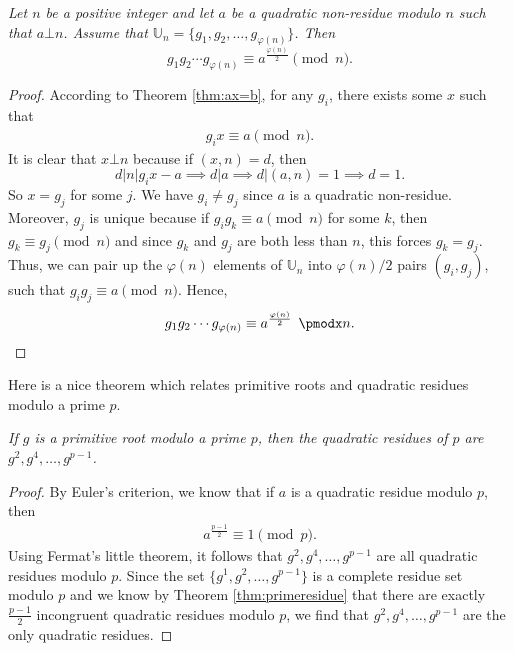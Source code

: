 \documentclass{subfile}
\begin{document}
	\begin{theorem}\slshape\label{prd}
		Let $n$ be a positive integer and let $a$ be a quadratic non-residue modulo $n$ such that $a\bot n$. Assume that $\mathbb U_n = \{g_1, g_2, \ldots, g_{\varphi(n)}\}$. Then
		\[g_1g_2\cdots g_{\varphi(n)}\equiv a^{\frac{\varphi(n)}{2}}\pmod n.\]
	\end{theorem}
	
	\begin{proof}
		According to Theorem \ref{thm:ax=b}, for any $g_i$, there exists some $x$ such that
			\begin{align}
				g_i x\equiv a\pmod n.
			\end{align}
		It is clear that $x \bot n$ because if $(x,n)=d$, then
			\[d|n|g_ix - a \implies d|a \implies d|(a,n)=1 \implies d=1.\]
		So $x=g_j$ for some $j$. We have $g_i \neq g_j$ since $a$ is a quadratic non-residue. Moreover, $g_j$ is unique because if $g_ig_k \equiv a \pmod n$ for some $k$, then $g_k \equiv g_j \pmod n$ and since $g_k$ and $g_j$ are both less than $n$, this forces $g_k=g_j$. Thus, we can pair up the $\varphi(n)$ elements of $\mathbb{U}_n$ into $\varphi(n)/2$ pairs $(g_i, g_j)$, such that $g_ig_j \equiv a \pmod n$. Hence, 
			\begin{equation*}
			g_1g_2\cdots g_{\varphi(n)}\equiv a^{\frac{\varphi(n)}{2}}\pmod n. \qedhere
			\end{equation*}
	\end{proof}
Here is a nice theorem which relates primitive roots and quadratic residues modulo a prime $p$.
	\begin{theorem}\slshape\label{thm:pr+qr}
		If $g$ is a primitive root modulo a prime $p$, then the quadratic residues of $p$ are $g^2,g^4,\ldots,g^{p-1}$.
	\end{theorem}

	\begin{proof}
		By Euler's criterion, we know that if $a$ is a quadratic residue modulo $p$, then
			\begin{align*}
				a^{\frac{p-1}{2}} \equiv 1 \pmod p.
			\end{align*}
		Using Fermat's little theorem, it follows that $g^2,g^4,\ldots,g^{p-1}$ are all quadratic residues modulo $p$. Since the set $\{g^1,g^2,\ldots,g^{p-1}\}$ is a complete residue set modulo $p$ and we know by Theorem \ref{thm:primeresidue} that there are exactly $\frac{p-1}{2}$ incongruent quadratic residues modulo $p$, we find that $g^2,g^4,\ldots,g^{p-1}$ are the only quadratic residues.
	\end{proof}
	
\end{document}
